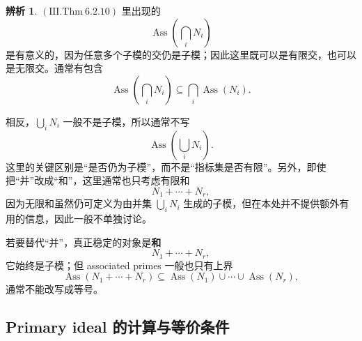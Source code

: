 \documentclass[a4paper]{ctexart}
\theoremstyle{definition}
\theoremstyle{analysis}
\newtheorem{remark}{辨析}[section]
\theoremstyle{plain}
\begin{document}
\label{rem:ass-intersection-sum}
\begin{remark}
\((\mathrm{III.Thm}\ 6.2.10)\) 里出现的
\[
  \operatorname{Ass}\!\left(\bigcap_i N_i\right)
\]
是有意义的，因为任意多个子模的交仍是子模；因此这里既可以是有限交，也可以是无限交。通常有包含
\[
  \operatorname{Ass}\!\left(\bigcap_i N_i\right)\subseteq \bigcap_i \operatorname{Ass}(N_i).
\]

相反，\(\bigcup_i N_i\) 一般不是子模，所以通常不写
\[
  \operatorname{Ass}\!\left(\bigcup_i N_i\right).
\]
这里的关键区别是“是否仍为子模”，而不是“指标集是否有限”。另外，即使把“并”改成“和”，这里通常也只考虑有限和
\[
  N_1+\cdots+N_r,
\]
因为无限和虽然仍可定义为由并集 \(\bigcup_i N_i\) 生成的子模，但在本处并不提供额外有用的信息，因此一般不单独讨论。

若要替代“并”，真正稳定的对象是\textbf{和}
\[
  N_1+\cdots+N_r,
\]
它始终是子模；但 associated primes 一般也只有上界
\[
  \operatorname{Ass}(N_1+\cdots+N_r)
  \subseteq
  \operatorname{Ass}(N_1)\cup\cdots\cup \operatorname{Ass}(N_r),
\]
通常不能改写成等号。
\end{remark}

\subsection{Primary ideal 的计算与等价条件}\label{subsec:primary-ideal-colon}
\end{document}
